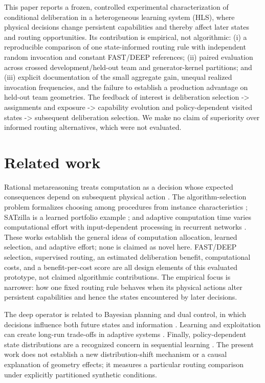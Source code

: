 \documentclass[11pt]{article}
\begin{document}
This paper reports a frozen, controlled experimental characterization of conditional deliberation in a heterogeneous learning system (HLS), where physical decisions change persistent capabilities and thereby affect later states and routing opportunities. Its contribution is empirical, not algorithmic: (i) a reproducible comparison of one state-informed routing rule with independent random invocation and constant FAST/DEEP references; (ii) paired evaluation across crossed development/held-out team and generator-kernel partitions; and (iii) explicit documentation of the small aggregate gain, unequal realized invocation frequencies, and the failure to establish a production advantage on held-out team geometries. The feedback of interest is deliberation selection -> assignments and exposure -> capability evolution and policy-dependent visited states -> subsequent deliberation selection. We make no claim of superiority over informed routing alternatives, which were not evaluated.

\section{Related work}
Rational metareasoning treats computation as a decision whose expected consequences depend on subsequent physical action \citep{russell1991,hay2012}. The algorithm-selection problem formalizes choosing among procedures from instance characteristics \citep{rice1976}; SATzilla is a learned portfolio example \citep{xu2008}; and adaptive computation time varies computational effort with input-dependent processing in recurrent networks \citep{graves2016}. These works establish the general ideas of computation allocation, learned selection, and adaptive effort; none is claimed as novel here. FAST/DEEP selection, supervised routing, an estimated deliberation benefit, computational costs, and a benefit-per-cost score are all design elements of this evaluated prototype, not claimed algorithmic contributions. The empirical focus is narrower: how one fixed routing rule behaves when its physical actions alter persistent capabilities and hence the states encountered by later decisions.

The deep operator is related to Bayesian planning and dual control, in which decisions influence both future states and information \citep{klenske2016}. Learning and exploitation can create long-run trade-offs in adaptive systems \citep{march1991}. Finally, policy-dependent state distributions are a recognized concern in sequential learning \citep{ross2011}. The present work does not establish a new distribution-shift mechanism or a causal explanation of geometry effects; it measures a particular routing comparison under explicitly partitioned synthetic conditions.
\end{document}
